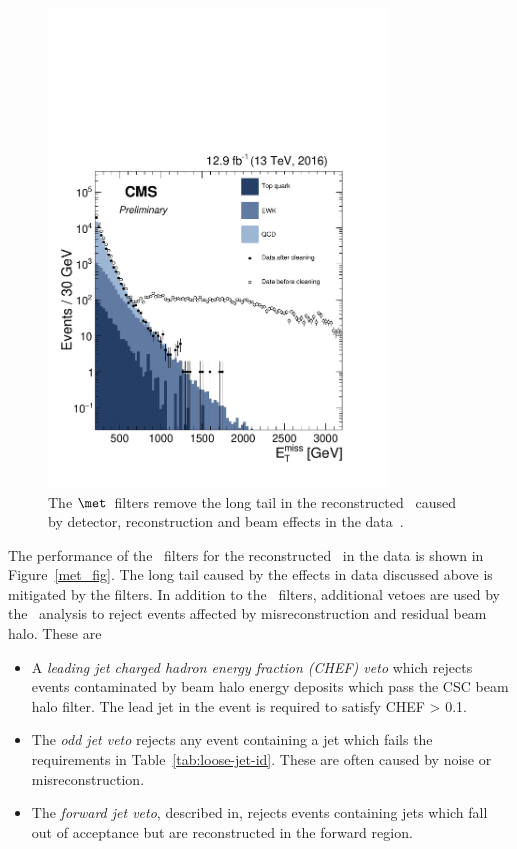 \begin{figure}
\centering
    \includegraphics[width=0.8\textwidth]{./Figures/alphat/met_clean}
  \caption{\label{fig:met_filter} The $\met$~filters remove the long tail in the reconstructed \met~caused by detector, reconstruction
  and beam effects in the data~\cite{met_fig}.} 
\end{figure}
The performance of the \met~filters for the reconstructed \met~in the data is shown in Figure~\ref{met_fig}. The long tail caused by
the effects in data discussed above is mitigated by the filters. In addition to the \met~filters, 
additional vetoes are used by the \alphat~analysis to reject events affected by misreconstruction and residual beam halo. These are
\begin{itemize}
\item A \emph{leading jet charged hadron energy fraction (CHEF) veto} which rejects events 
contaminated by beam halo energy deposits which pass the CSC beam halo filter. The lead jet 
in the event is required to satisfy CHEF > 0.1.
\item The \emph{odd jet veto} rejects any event containing a jet which fails the 
requirements in Table~\ref{tab:loose-jet-id}. These are often caused by noise or misreconstruction.
\item The \emph{forward jet veto}, described in, rejects events containing jets which fall out of acceptance but
are reconstructed in the forward region. 
\end{itemize}

